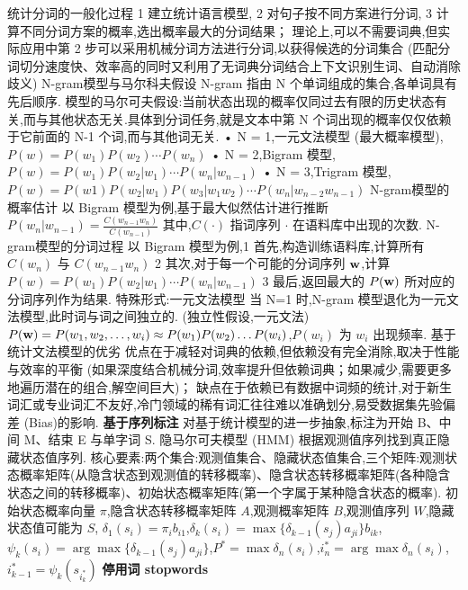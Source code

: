\documentclass[10pt, utf8]{ctexart}
\begin{document}
\begin{multicols}{4}
    {\color{blue}统计分词的一般化过程}
    1 建立统计语言模型, 2 对句子按不同方案进行分词, 3 计算不同分词方案的概率,选出概率最大的分词结果；
    理论上,可以不需要词典,但实际应用中第 2 步可以采用机械分词方法进行分词,以获得候选的分词集合 (匹配分词切分速度快、效率高的同时又利用了无词典分词结合上下文识别生词、自动消除歧义)
    {\color{blue}N-gram模型与马尔科夫假设}
    N-gram 指由 N 个单词组成的集合,各单词具有先后顺序.
    模型的马尔可夫假设:当前状态出现的概率仅同过去有限的历史状态有关,而与其他状态无关.具体到分词任务,就是文本中第 N 个词出现的概率仅仅依赖于它前面的 N-1 个词,而与其他词无关.
    • N = 1,一元文法模型 (最大概率模型),$P(w)=P(w_1)P(w_2)\cdots P(w_n)$
    • N = 2,Bigram 模型,$P(w)=P(w_1)P(w_2|w_1)\cdots P(w_n|w_{n-1})$
    • N = 3,Trigram 模型,$P(w)=P(w1)P(w_2|w_1)P(w_3|w_1w_2)\cdots P(w_n|w_{n-2}w_{n-1})$
    {\color{red}N-gram模型的概率估计}
    以 Bigram 模型为例,基于最大似然估计进行推断 $P(w_n|w_{n-1})=\frac{C(w_{n-1}w_n)}{C(w_{n-1})}$
    其中,$C(\cdot)$ 指词序列 $\cdot$ 在语料库中出现的次数.
    {\color{blue}N-gram模型的分词过程}
    以 Bigram 模型为例,1 首先,构造训练语料库,计算所有 $C(w_n)$ 与 $C(w_{n-1}w_n)$ 2 其次,对于每一个可能的分词序列 $\bf w$,计算 $P(w) = P(w_1) P(w_2|w_1)\cdots P(w_n|w_{n-1})$ 3 最后,返回最大的 $P({\bf w})$ 所对应的分词序列作为结果.
    {\color{blue}特殊形式:一元文法模型}
    当 N=1 时,N-gram 模型退化为一元文法模型,此时词与词之间独立的. (独立性假设,一元文法)
    $P({\bf w})=P(w_1,w_2,\ldots,w_i)\approx P(w_1)P(w_2)\ldots P(w_i)$,$P(w_i)$ 为 $w_i$ 出现频率.
    {\color{blue}基于统计文法模型的优劣}
    优点在于减轻对词典的依赖,但依赖没有完全消除,取决于性能与效率的平衡 (如果深度结合机械分词,效率提升但依赖词典；如果减少,需要更多地遍历潜在的组合,解空间巨大)；
    缺点在于依赖已有数据中词频的统计,对于新生词汇或专业词汇不友好,冷门领域的稀有词汇往往难以准确划分,易受数据集先验偏差 (Bias)的影响.
    {\color{purple_}\textbf{基于序列标注}} 对基于统计模型的进一步抽象,标注为开始 B、中间 M、结束 E 与单字词 S.
        {\color{red}隐马尔可夫模型 (HMM)} 根据观测值序列找到真正隐藏状态值序列.
    核心要素:两个集合:观测值集合、隐藏状态值集合,三个矩阵:观测状态概率矩阵(从隐含状态到观测值的转移概率)、隐含状态转移概率矩阵(各种隐含状态之间的转移概率)、初始状态概率矩阵(第一个字属于某种隐含状态的概率).
    初始状态概率向量 $\pi$,隐含状态转移概率矩阵 $A$,观测概率矩阵 $B$,观测值序列 $W$,隐藏状态值可能为 $S$,
    $\delta_1(s_i)=\pi_{i}b_{i1}$,$\delta_k(s_i)=\max\{\delta_{k-1}(s_j)a_{ji}\}b_{ik}$,$\psi_k(s_i)=\arg\max\{\delta_{k-1}(s_j)a_{ji}\}$,$P^*=\max\delta_n(s_i)$,$i_n^*=\arg\max\delta_n(s_i)$,$i_{k-1}^*=\psi_k(s_{i_k^*})$
    {\color{purple_}\textbf{停用词 stopwords}}

\end{multicols}
\end{document}

